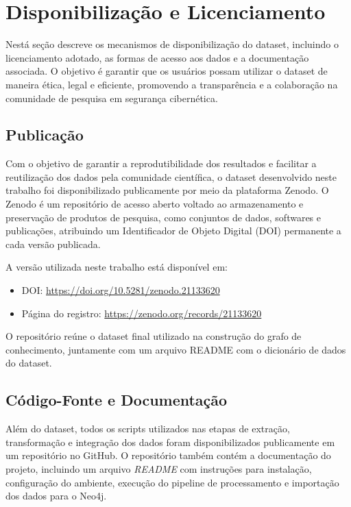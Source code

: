 \section{Disponibilização e Licenciamento}

Nestá seção descreve os mecanismos de disponibilização do dataset, incluindo o licenciamento adotado, as formas de acesso aos dados e a documentação associada. O objetivo é garantir que os usuários possam utilizar o dataset de maneira ética, legal e eficiente, promovendo a transparência e a colaboração na comunidade de pesquisa em segurança cibernética.

\subsection{Publicação}

Com o objetivo de garantir a reprodutibilidade dos resultados e facilitar a reutilização dos dados pela comunidade científica, o dataset desenvolvido neste trabalho foi disponibilizado publicamente por meio da plataforma
Zenodo. O Zenodo é um repositório de acesso aberto voltado ao armazenamento e preservação de produtos de pesquisa, como conjuntos de dados, softwares e publicações, atribuindo um Identificador de Objeto Digital (DOI) permanente a cada versão publicada.

A versão utilizada neste trabalho está disponível em:

\begin{itemize}
    \item DOI: \url{https://doi.org/10.5281/zenodo.21133620}
    \item Página do registro: \url{https://zenodo.org/records/21133620}
\end{itemize}

O repositório reúne o dataset final utilizado na construção do grafo de conhecimento, juntamente com um arquivo README com o dicionário de dados do dataset.

\subsection{Código-Fonte e Documentação}

Além do dataset, todos os scripts utilizados nas etapas de extração, transformação e integração dos dados foram disponibilizados publicamente em um repositório no GitHub. O repositório também contém a documentação do projeto, incluindo um arquivo \textit{README} com instruções para instalação, configuração do ambiente, execução do pipeline de processamento e importação dos dados para o Neo4j.

